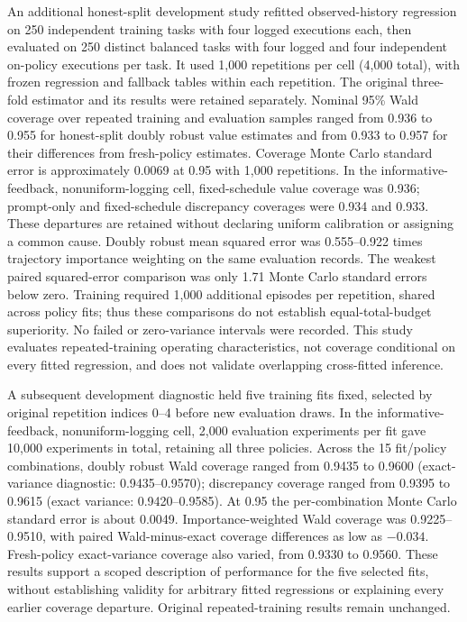An additional honest-split development study refitted observed-history regression on 250 independent
training tasks with four logged executions each, then evaluated on 250 distinct balanced tasks with four
logged and four independent on-policy executions per task. It used 1,000 repetitions per cell (4,000 total),
with frozen regression and fallback tables within each repetition. The original three-fold estimator and
its results were retained separately. Nominal 95\% Wald coverage over repeated training and evaluation
samples ranged from 0.936 to 0.955 for honest-split doubly robust value estimates and from 0.933 to 0.957
for their differences from fresh-policy estimates. Coverage Monte Carlo standard error is approximately
0.0069 at 0.95 with 1,000 repetitions. In the informative-feedback, nonuniform-logging cell, fixed-schedule
value coverage was 0.936; prompt-only and fixed-schedule discrepancy coverages were 0.934 and 0.933.
These departures are retained without declaring uniform calibration or assigning a common cause.
Doubly robust mean squared error was 0.555--0.922 times trajectory importance weighting on the same
evaluation records. The weakest paired squared-error comparison was only 1.71 Monte Carlo standard errors
below zero. Training required 1,000 additional episodes per repetition, shared across policy fits; thus
these comparisons do not establish equal-total-budget superiority. No failed or zero-variance intervals
were recorded. This study evaluates repeated-training operating characteristics, not coverage conditional
on every fitted regression, and does not validate overlapping cross-fitted inference.

A subsequent development diagnostic held five training fits fixed, selected by original repetition indices
0--4 before new evaluation draws. In the informative-feedback, nonuniform-logging cell, 2,000 evaluation
experiments per fit gave 10,000 experiments in total, retaining all three policies. Across the 15 fit/policy
combinations, doubly robust Wald coverage ranged from 0.9435 to 0.9600 (exact-variance diagnostic:
0.9435--0.9570); discrepancy coverage ranged from 0.9395 to 0.9615 (exact variance: 0.9420--0.9585).
At 0.95 the per-combination Monte Carlo standard error is about 0.0049. Importance-weighted Wald coverage
was 0.9225--0.9510, with paired Wald-minus-exact coverage differences as low as $-0.034$.
Fresh-policy exact-variance coverage also varied, from 0.9330 to 0.9560. These results support a scoped
description of performance for the five selected fits, without establishing validity for arbitrary fitted
regressions or explaining every earlier coverage departure. Original repeated-training results remain unchanged.

